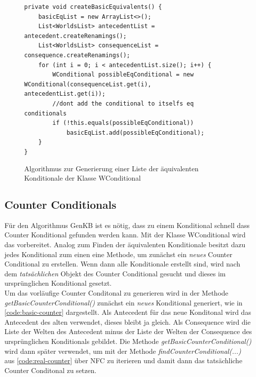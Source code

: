 \documentclass[12pt,a4paper]{article}
\begin{document}
\begin{figure}
\begin{lstlisting}
private void createBasicEquivalents() {
    basicEqList = new ArrayList<>();
    List<WorldsList> antecedentList = antecedent.createRenamings();
    List<WorldsList> consequenceList = consequence.createRenamings();
    for (int i = 0; i < antecedentList.size(); i++) {
        WConditional possibleEqConditional = new WConditional(consequenceList.get(i), antecedentList.get(i));
        //dont add the conditional to itselfs eq conditionals
        if (!this.equals(possibleEqConditional))
            basicEqList.add(possibleEqConditional);
    }
}
\end{lstlisting}
\caption{Algorithmus zur Generierung einer Liste der äquivalenten Konditionale der Klasse WConditional}
\label{code:create-equivalents}
\end{figure} 




\subsection{Counter Conditionals}
Für den Algorithmus GenKB ist es nötig, dass zu einem Konditional schnell dass Counter Konditional gefunden werden kann. Mit der Klasse WConditional wird das vorbereitet. Analog zum Finden der äquivalenten Konditionale besitzt dazu jedes Konditional zum einen eine Methode, um zunächst ein \textit{neues} Counter Conditional zu erstellen. Wenn dann alle Konditionale erstellt sind, wird nach dem \textit{tatsächlichen} Objekt des Counter Conditional gesucht und dieses im ursprünglichen Konditional gesetzt. \\
Um das vorläufige Counter Conditonal zu generieren wird in der Methode \textit{getBasicCounterConditional()} zunächst ein \textit{neues} Konditional generiert, wie in  \autoref{code:basic-counter} dargestellt. Als Antecedent für das neue Konditonal wird das Antecedent des alten verwendet, dieses bleibt ja gleich. Als Consequence wird die Liste der Welten des Antecedent minus der Liste der Welten der Consequence  des ursprünglichen Konditionals gebildet. Die Methode \textit{getBasicCounterConditional()} wird dann später verwendet, um mit der Methode \textit{findCounterConditional(...)} aus \autoref{code:real-counter} über NFC zu iterieren und damit dann das tatsächliche Counter Conditonal zu setzen.
\end{document}
